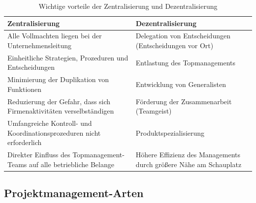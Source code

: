 \documentclass[11pt,a4paper]{article}
\begin{document}
\begin{table}[H]
\centering
\def\arraystretch{1.4}
\begin{tabular}{|P{0.4\textwidth}|P{0.4\textwidth}|}
\hline
\textbf{Zentralisierung} & \textbf{Dezentralisierung}\\
\hline
\hline
Alle Vollmachten liegen bei der Unternehmensleitung & Delegation von Entscheidungen (Entscheidungen vor Ort)\\
\hline
Einheitliche Strategien, Prozeduren und Entscheidungen & Entlastung des Topmanagements\\

\hline
Minimierung der Duplikation von Funktionen & Entwicklung von Generalisten\\
\hline
Reduzierung der Gefahr, dass sich Firmenaktivitäten verselbständigen & Förderung der Zusammenarbeit (Teamgeist)\\
\hline
Umfangreiche Kontroll- und Koordinationsprozeduren nicht erforderlich & Produktspezialisierung\\
\hline
Direkter Einfluss des Topmanagement-Teams auf alle betriebliche Belange & Höhere Effizienz des Managements durch größere Nähe am Schauplatz\\
\hline
\end{tabular}
\caption{Wichtige vorteile der Zentralisierung und Dezentralisierung}
\end{table}

\subsection{Projektmanagement-Arten}
\end{document}
